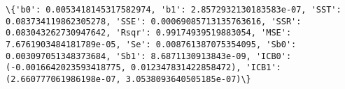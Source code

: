 \documentclass[11pt]{article}
\begin{document}
    \begin{Verbatim}[commandchars=\\\{\}]
\{'b0': 0.0053418145317582974, 'b1': 2.8572932130183583e-07, 'SST': 0.083734119862305278, 'SSE': 0.00069085713135763616, 'SSR': 0.083043262730947642, 'Rsqr': 0.99174939519883054, 'MSE': 7.6761903484181789e-05, 'Se': 0.008761387075354095, 'Sb0': 0.003097051348373684, 'Sb1': 8.6871130913843e-09, 'ICB0': (-0.0016642023593418775, 0.012347831422858472), 'ICB1': (2.660777061986198e-07, 3.0538093640505185e-07)\}

    \end{Verbatim}

    \begin{center}
    \end{center}
    { \hspace*{\fill} \\}
    
\end{document}
